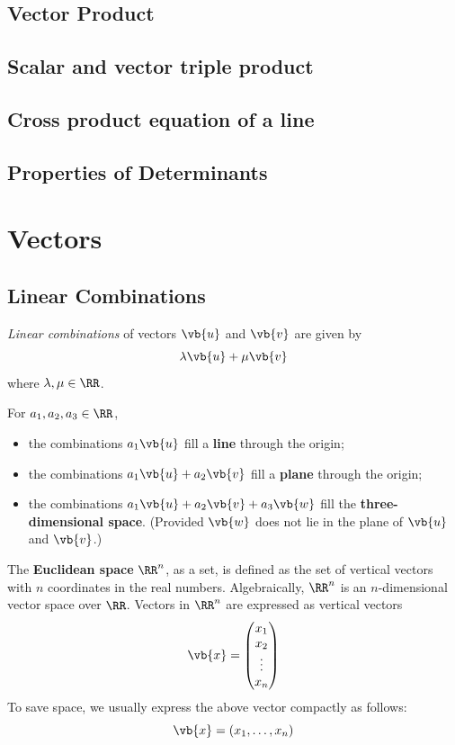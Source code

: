 \subsection{Vector Product}
\subsection{Scalar and vector triple product}
\subsection{Cross product equation of a line}
\subsection{Properties of Determinants}


\section{Vectors}
\subsection{Linear Combinations}
\emph{Linear combinations} of vectors $\vb{u}$ and $\vb{v}$ are given by
\[ \lambda\vb{u}+\mu\vb{v} \]
where $\lambda,\mu\in\RR$.

For $a_1,a_2,a_3\in\RR$, 
\begin{itemize}
\item the combinations $a_1\vb{u}$ fill a \textbf{line} through the origin; 
\item the combinations $a_1\vb{u}+a_2\vb{v}$ fill a \textbf{plane} through the origin; 
\item the combinations $a_1\vb{u}+a_2\vb{v}+a_3\vb{w}$ fill the \textbf{three-dimensional space}. (Provided $\vb{w}$ does not lie in the plane of $\vb{u}$ and $\vb{v}$.)
\end{itemize}

The \textbf{Euclidean space} $\RR^n$, as a set, is defined as the set of vertical vectors with $n$ coordinates in the real numbers. Algebraically, $\RR^n$ is an $n$-dimensional vector space over $\RR$. Vectors in $\RR^n$ are expressed as vertical vectors 
\[ \vb{x} = \begin{pmatrix} x_1 \\ x_2 \\ \vdots \\ x_n \end{pmatrix} \]
To save space, we usually express the above vector compactly as follows:
\[ \vb{x}=(x_1,\dots,x_n) \]

